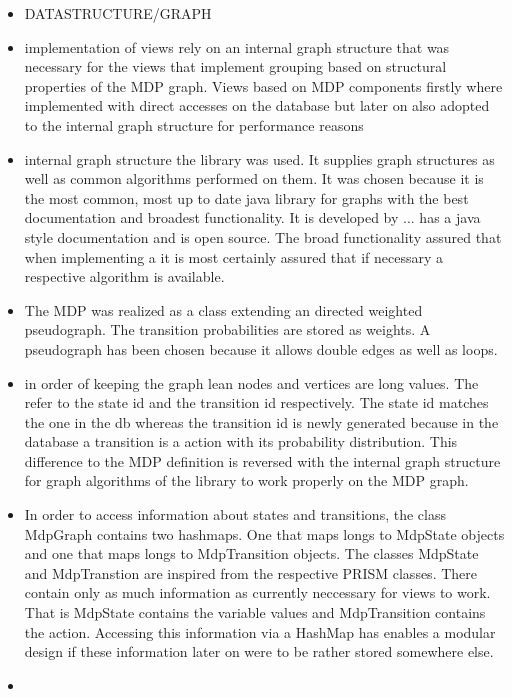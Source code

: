 \documentclass[preview]{standalone}
\begin{document}
\begin{itemize}
	
	\item DATASTRUCTURE/GRAPH
	\item implementation of views rely on an internal graph structure that was necessary for the views that implement grouping based on structural properties of the MDP graph. Views based on MDP components firstly where implemented with direct accesses on the database but later on also adopted to the internal graph structure for performance reasons
	\item internal graph structure the \jgrapht library was used. It supplies graph structures as well as common algorithms performed on them. It was chosen because it is the most common, most up to date java library for graphs with the best documentation and broadest functionality. It is developed by ... has a java style documentation and is open source. The broad functionality assured that when implementing a \viewN it is most certainly assured that if necessary a respective algorithm is available.
	\item The MDP was realized as a class extending an directed weighted pseudograph. The transition probabilities are stored as weights. A pseudograph has been chosen because it allows double edges as well as loops.	
	\item in order of keeping the graph lean nodes and vertices are long values. The refer to the state id and the transition id respectively. The state id matches the one in the db whereas the transition id is newly generated because in the database a transition is a action with its probability distribution. This difference to the MDP definition is reversed with the internal graph structure for graph algorithms of the \jgrapht library to work properly on the MDP graph.
	\item In order to access information about states and transitions, the class MdpGraph contains two hashmaps. One that maps longs to MdpState objects and one that maps longs to MdpTransition objects. The classes MdpState and MdpTranstion are inspired from the respective PRISM classes. There contain only as much information as currently neccessary for views to work. That is MdpState contains the variable values and MdpTransition contains the action. Accessing this information via a HashMap has enables a modular design if these information later on were to be rather stored somewhere else.
	
	\item {}
	
\end{itemize}
\end{document}
